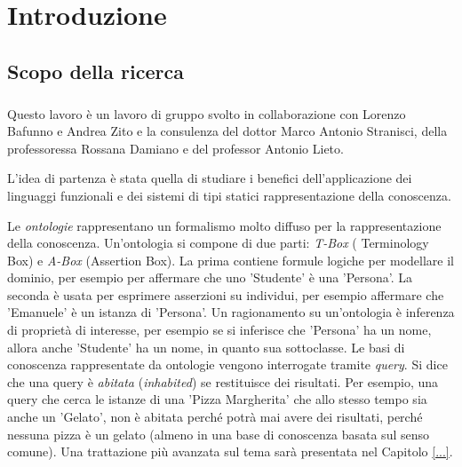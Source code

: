 \chapter{Introduzione}

\section{Scopo della ricerca}
\paragraph{} Questo lavoro è un lavoro di gruppo svolto in collaborazione con Lorenzo Bafunno e Andrea Zito e la consulenza del dottor Marco Antonio Stranisci, della professoressa Rossana Damiano e del professor Antonio Lieto.

L'idea di partenza è stata quella di studiare i benefici dell'applicazione dei linguaggi funzionali e dei sistemi di tipi statici
 rappresentazione della conoscenza. 
 
Le \emph{ontologie} rappresentano un formalismo molto diffuso per la rappresentazione della conoscenza. Un'ontologia si compone di due parti: \emph{T-Box} ( Terminology Box) e \emph{A-Box} (Assertion Box). La prima contiene formule logiche per modellare il dominio, per esempio per affermare che uno 'Studente' è una 'Persona'. La seconda è usata per esprimere asserzioni su individui, per esempio affermare che 'Emanuele' è un istanza di 'Persona'. Un ragionamento su un'ontologia è inferenza di proprietà di interesse, per esempio se si inferisce che 'Persona' ha un nome, allora anche 'Studente' ha un nome, in quanto sua sottoclasse. Le basi di conoscenza rappresentate da ontologie vengono interrogate tramite \emph{query}. Si dice che una query è \emph{abitata} (\emph{inhabited}) se  restituisce dei risultati. Per esempio, una query che cerca le istanze di una 'Pizza Margherita' che allo stesso tempo sia anche un 'Gelato', non è abitata perché potrà mai avere dei risultati, perché nessuna pizza è un gelato (almeno in una base di conoscenza basata sul senso comune).  Una trattazione più avanzata sul tema sarà presentata nel Capitolo \ref{...}.

